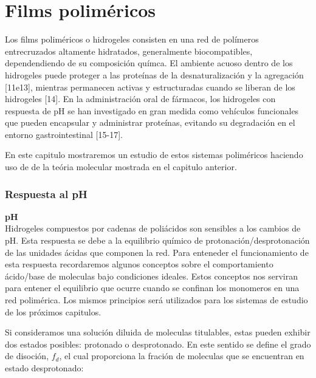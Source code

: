 
\chapter{Films polim\'ericos} %

\label{Chapter2} %



Los films polim\'ericos o hidrogeles  consisten en una red de pol\'imeros entrecruzados altamente hidratados, generalmente biocompatibles, dependendiendo de su composici\'on qu\'imca. El ambiente acuoso dentro de los hidrogeles puede proteger a las prote\'inas de la desnaturalización y la agregaci\'on [11e13], mientras permanecen activas y estructuradas cuando se liberan de los hidrogeles [14]. En la administraci\'on oral de f\'armacos, los hidrogeles con respuesta de pH se han investigado en gran medida como veh\'iculos funcionales que pueden encapsular y administrar prote\'inas, evitando su degradaci\'on en el entorno gastrointestinal [15-17].


En este capitulo mostraremos un estudio  de estos sistemas polim\'ericos haciendo uso de de la te\'oria molecular mostrada en el capitulo anterior. 



\subsection{Respuesta al pH}
\textbf{pH} \\
Hidrogeles  compuestos por cadenas de poli\'acidos son sensibles a los cambios de pH. Esta respuesta se debe a la equilibrio qu\'imico de protonaci\'on/desprotonaci\'on de las unidades \'acidas que componen la red. 
Para enteneder el funcionamiento de esta respuesta recordaremos algunos conceptos sobre el comportamiento \'acido/base de moleculas bajo condiciones ideales. 
Estos conceptos nos serviran para entener el equilibrio que ocurre cuando se confinan los monomeros en una red polim\'erica. Los mismos principios ser\'a utilizados para los sistemas  de estudio de los pr\'oximos capitulos.

Si consideramos una soluci\'on diluida de moleculas titulables, estas pueden exhibir dos estados posibles: protonado o desprotonado. En este sentido se define el grado de disoción, $f_d$, el cual  proporciona la fraci\'on de moleculas que se encuentran en estado desprotonado:


